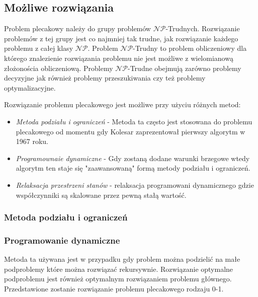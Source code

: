 \subsection{Możliwe rozwiązania}

Problem plecakowy należy do grupy problemów $\mathcal{NP}$-Trudnych. Rozwiązanie problemów z tej grupy jest co najmniej tak trudne, jak rozwiązanie każdego problemu z całej klasy $\mathcal{NP}$. Problem $\mathcal{NP}$-Trudny to problem obliczeniowy dla którego znalezienie rozwiązania problemu nie jest możliwe z wielomianową złożonościa obliczeniową. Problemy $\mathcal{NP}$-Trudne obejmują zarówno problemy decyzyjne jak również problemy przeszukiwania czy też problemy optymalizacyjne.

Rozwiązanie problemu plecakowego jest możliwe przy użyciu różnych metod:
\begin{itemize}
  \item \textit{Metoda podziału i ograniczeń} - Metoda ta często jest stosowana do problemu plecakowego od momentu gdy Kolesar \cite{KolesarArticle} zaprezentował pierwszy algorytm w 1967 roku.
  \item \textit{Programownaie dynamiczne} - Gdy zostaną dodane warunki brzegowe wtedy algorytm ten staje się "zaawansowaną" formą metody podziału i ograniczeń.
  \item \textit{Relaksacja przestrzeni stanów} - relaksacja programowani dynamicznego gdzie współczynniki są skalowane przez pewną stałą wartość.
\end{itemize}

\subsubsection{Metoda podziału i ograniczeń}
\subsubsection{Programowanie dynamiczne}
Metoda ta używana jest w przypadku gdy problem można podzielić na małe podproblemy które można rozwiązać rekursywnie. Rozwiązanie optymalne podproblemu jest również optymalnym rozwiązaniem problemu głównego. Przedstawione zostanie rozwiązanie problemu plecakowego rodzaju 0-1.

